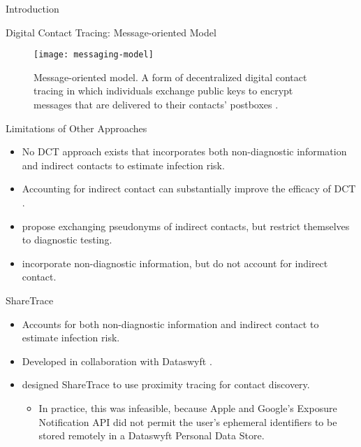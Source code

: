 \documentclass[11pt]{beamer}
\begin{document}
\begin{section}{Introduction}
\begin{frame}{Digital Contact Tracing: Message-oriented Model}
\begin{figure}
  \centering
  \texttt{[image: messaging-model]}
  \caption[Message-oriented model]{Message-oriented model. A form of decentralized digital contact tracing in which individuals exchange public keys to encrypt messages that are delivered to their contacts' postboxes \cite{Reichert2021}.}
\end{figure}
\end{frame}

\begin{frame}{Limitations of Other Approaches}
\begin{itemize}
  \item No DCT approach exists that incorporates both non-diagnostic information and indirect contacts to estimate infection risk.
  \item Accounting for indirect contact can substantially improve the efficacy of DCT \citep{PozoMartin2023}.
  \item \citet{Cherini2023} propose exchanging pseudonyms of indirect contacts, but restrict themselves to diagnostic testing.
  \item \citet{Gupta2023} incorporate non-diagnostic information, but do not account for indirect contact.
\end{itemize}
\end{frame}

\begin{frame}{ShareTrace}
\begin{itemize}
  \item Accounts for both non-diagnostic information and indirect contact to estimate infection risk.
  \item Developed in collaboration with Dataswyft \citep{Ayday2020}. 
  \item \citet{Ayday2021} designed ShareTrace to use proximity tracing for contact discovery.
    \begin{itemize}
      \item In practice, this was infeasible, because Apple and Google's Exposure Notification API did not permit the user's ephemeral identifiers to be stored remotely in a Dataswyft Personal Data Store.
    \end{itemize}
\end{itemize}
\end{frame}

\end{section}
\end{document}
